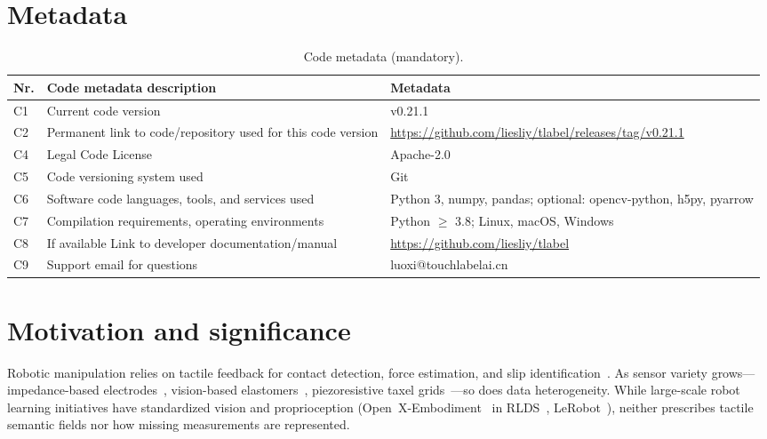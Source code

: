 \documentclass[preprint,12pt,a4paper]{elsarticle}
\begin{document}
\section*{Metadata}
\begin{table}[!h]
\begin{tabular}{|l|p{6.5cm}|p{6.5cm}|}
\hline
\textbf{Nr.} & \textbf{Code metadata description} & \textbf{Metadata} \\
\hline
C1 & Current code version & v0.21.1 \\
\hline
C2 & Permanent link to code/repository used for this code version & \url{https://github.com/liesliy/tlabel/releases/tag/v0.21.1} \\
\hline
C4 & Legal Code License & Apache-2.0 \\
\hline
C5 & Code versioning system used & Git \\
\hline
C6 & Software code languages, tools, and services used & Python 3, numpy, pandas; optional: opencv-python, h5py, pyarrow \\
\hline
C7 & Compilation requirements, operating environments & Python $\geq$ 3.8; Linux, macOS, Windows \\
\hline
C8 & If available Link to developer documentation/manual & \url{https://github.com/liesliy/tlabel} \\
\hline
C9 & Support email for questions & luoxi@touchlabelai.cn \\
\hline
\end{tabular}
\caption{Code metadata (mandatory).}
\label{tab:codeMetadata}
\end{table}

\section{Motivation and significance}
\label{sec:motivation}

Robotic manipulation relies on tactile feedback for contact detection, force estimation, and slip identification~\cite{lambeta2020digit,yuan2017gelsight}. As sensor variety grows---impedance-based electrodes~\cite{syntouch2018biotac}, vision-based elastomers~\cite{yuan2017gelsight}, piezoresistive taxel grids~\cite{paxini2023}---so does data heterogeneity. While large-scale robot learning initiatives have standardized vision and proprioception (Open~X-Embodiment~\cite{openxembodiment} in RLDS~\cite{rlds}, LeRobot~\cite{lerobot,lerobotdocs}), neither prescribes tactile semantic fields nor how missing measurements are represented.
\end{document}
